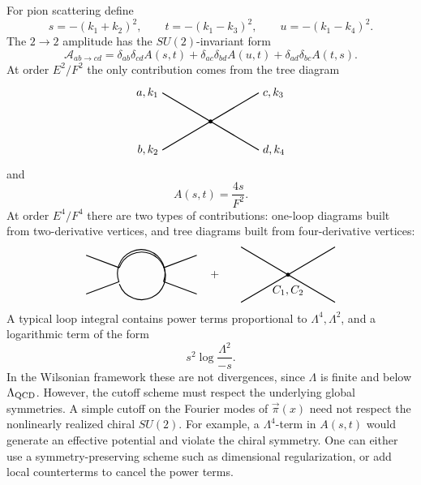 For pion scattering define
\[
  s=-(k_1+k_2)^2,\qquad
  t=-(k_1-k_3)^2,\qquad
  u=-(k_1-k_4)^2.
\]
The \(2\to2\) amplitude has the \(SU(2)\)-invariant form
\[
  \mathcal A_{ab\to cd}
  =
  \delta_{ab}\delta_{cd}A(s,t)
  +\delta_{ac}\delta_{bd}A(u,t)
  +\delta_{ad}\delta_{bc}A(t,s).
\]
At order \(E^2/F^2\) the only contribution comes from the tree diagram
\[
\begin{tikzpicture}[>=Stealth,scale=0.88,baseline={(0,-0.15)}]
  \draw[thick] (-1.7,1) -- (0,0);
  \draw[thick] (-1.7,-1) -- (0,0);
  \draw[thick] (0,0) -- (1.7,1);
  \draw[thick] (0,0) -- (1.7,-1);
  \fill (0,0) circle (2pt);
  \node[left] at (-1.7,1) {\(a,k_1\)};
  \node[left] at (-1.7,-1) {\(b,k_2\)};
  \node[right] at (1.7,1) {\(c,k_3\)};
  \node[right] at (1.7,-1) {\(d,k_4\)};
\end{tikzpicture}
\]
and
\[
  A(s,t)=\frac{4s}{F^2}.
\]
At order \(E^4/F^4\) there are two types of contributions: one-loop
diagrams built from two-derivative vertices, and tree diagrams built from
four-derivative vertices:
\[
\begin{tikzpicture}[>=Stealth,scale=0.86,baseline={(0,-0.15)}]
  \draw[thick] (-2.0,0.7) -- (-0.8,0.25);
  \draw[thick] (-2.0,-0.7) -- (-0.8,-0.25);
  \draw[thick] (0.8,0.25) -- (2.0,0.7);
  \draw[thick] (0.8,-0.25) -- (2.0,-0.7);
  \draw[thick] (-0.8,0.25) arc (160:-160:0.86);
  \draw[thick] (0.8,-0.25) arc (-20:200:0.86);
  \node at (2.65,0) {\(+\)};
  \begin{scope}[xshift=5.3cm]
    \draw[thick] (-1.7,1) -- (0,0);
    \draw[thick] (-1.7,-1) -- (0,0);
    \draw[thick] (0,0) -- (1.7,1);
    \draw[thick] (0,0) -- (1.7,-1);
    \fill (0,0) circle (2pt);
    \node[below] at (0,-0.25) {\(C_1,C_2\)};
  \end{scope}
\end{tikzpicture}
\]
A typical loop integral contains power terms proportional to
\(\Lambda^4,\Lambda^2\), and a logarithmic term of the form
\[
  s^2\log\frac{\Lambda^2}{-s}.
\]
In the Wilsonian framework these are not divergences, since
\(\Lambda\) is finite and below \(\Lambda_{\rm QCD}\).  However, the
cutoff scheme must respect the underlying global symmetries.  A simple
cutoff on the Fourier modes of \(\vec\pi(x)\) need not respect the
nonlinearly realized chiral \(SU(2)\).  For example, a
\(\Lambda^4\)-term in \(A(s,t)\) would generate an effective potential
and violate the chiral symmetry.  One can either use a
symmetry-preserving scheme such as dimensional regularization, or add
local counterterms to cancel the power terms.

